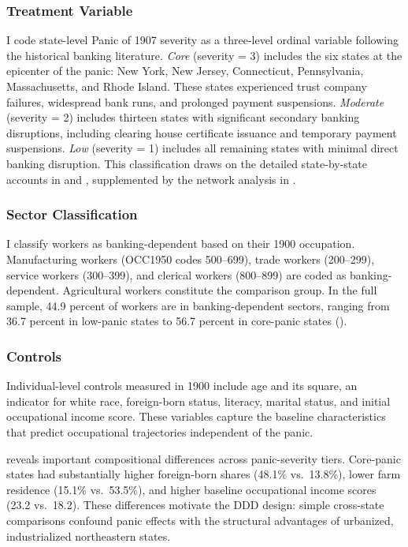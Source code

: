 \documentclass[12pt]{article}
\begin{document}
\subsubsection*{Treatment Variable} I code state-level Panic of 1907 severity as a three-level ordinal variable following the historical banking literature. \textit{Core} (severity = 3) includes the six states at the epicenter of the panic: New York, New Jersey, Connecticut, Pennsylvania, Massachusetts, and Rhode Island. These states experienced trust company failures, widespread bank runs, and prolonged payment suspensions. \textit{Moderate} (severity = 2) includes thirteen states with significant secondary banking disruptions, including clearing house certificate issuance and temporary payment suspensions. \textit{Low} (severity = 1) includes all remaining states with minimal direct banking disruption. This classification draws on the detailed state-by-state accounts in \citet{wicker2000banking} and \citet{moen1992bank}, supplemented by the network analysis in \citet{frydman2023panic}.

\subsubsection*{Sector Classification} I classify workers as banking-dependent based on their 1900 occupation. Manufacturing workers (OCC1950 codes 500--699), trade workers (200--299), service workers (300--399), and clerical workers (800--899) are coded as banking-dependent. Agricultural workers constitute the comparison group. In the full sample, 44.9 percent of workers are in banking-dependent sectors, ranging from 36.7 percent in low-panic states to 56.7 percent in core-panic states ().

\subsubsection*{Controls} Individual-level controls measured in 1900 include age and its square, an indicator for white race, foreign-born status, literacy, marital status, and initial occupational income score. These variables capture the baseline characteristics that predict occupational trajectories independent of the panic.



 reveals important compositional differences across panic-severity tiers. Core-panic states had substantially higher foreign-born shares (48.1\% vs.\ 13.8\%), lower farm residence (15.1\% vs.\ 53.5\%), and higher baseline occupational income scores (23.2 vs.\ 18.2). These differences motivate the DDD design: simple cross-state comparisons confound panic effects with the structural advantages of urbanized, industrialized northeastern states.
\end{document}
